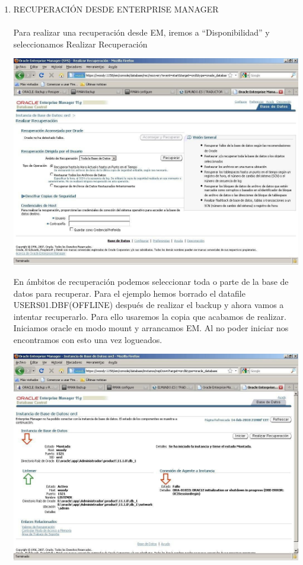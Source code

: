 \begin{enumerate}[1.]
	\item RECUPERACIÓN  DESDE  ENTERPRISE  MANAGER
	\\\\Para realizar una recuperación desde EM, iremos a “Disponibilidad” y seleccionamos Realizar Recuperación
	\begin{center}
	\includegraphics[width=15cm]{./Imagenes/recu_1}  
	\end{center}	
	En ámbitos de recuperación podemos seleccionar toda o parte de la base de datos para recuperar.
Para  el  ejemplo  hemos  borrado  el  datafile  USERS01.DBF(OFFLINE)  después  de realizar el backup y ahora vamos a intentar recuperarlo. Para ello usaremos la copia que acabamos de realizar. Iniciamos oracle en modo mount y arrancamos EM. Al no poder iniciar nos encontramos con esto una vez logueados.
	\begin{center}
	\includegraphics[width=15cm]{./Imagenes/recu_2}  

\end{center}
\end{enumerate}

